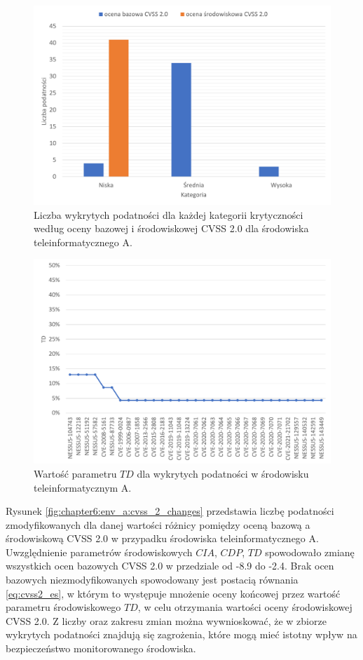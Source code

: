 \begin{figure}[!ht]
\centering
\includegraphics[width=.9\textwidth]{Chapters/Eksperymenty/env_A_results/cvss_2.pdf}
\caption{Liczba wykrytych podatności dla każdej kategorii krytyczności według oceny bazowej i środowiskowej CVSS 2.0 dla środowiska teleinformatycznego A.}
\label{fig:chapter6:env_a:cvss_2}
\end{figure}

\begin{figure}[!ht]
\centering
\includegraphics[width=.9\textwidth]{Chapters/Eksperymenty/env_A_results/cvss_2_td_env_a.pdf}
\caption{Wartość parametru $TD$ dla wykrytych podatności w środowisku teleinformatycznym A.}
\label{fig:chapter6:env_a:cvss_2_td}
\end{figure}

\bigbreak
Rysunek \ref{fig:chapter6:env_a:cvss_2_changes} przedstawia liczbę podatności zmodyfikowanych dla danej wartości różnicy pomiędzy oceną bazową a środowiskową CVSS 2.0 w przypadku środowiska teleinformatycznego A. Uwzględnienie parametrów środowiskowych $CIA$, $CDP$, $TD$ spowodowało zmianę wszystkich ocen bazowych CVSS 2.0 w przedziale od -8.9 do -2.4. Brak ocen bazowych niezmodyfikowanych spowodowany jest postacią równania \ref{eq:cvss2_es}, w którym to występuje mnożenie oceny końcowej przez wartość parametru środowiskowego $TD$, w celu otrzymania wartości oceny środowiskowej CVSS 2.0. Z liczby oraz zakresu zmian można wywnioskować, że w zbiorze wykrytych podatności znajdują się zagrożenia, które mogą mieć istotny wpływ na bezpieczeństwo monitorowanego środowiska. 

